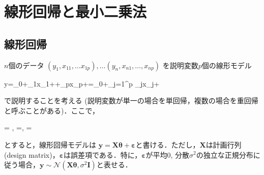 \section{線形回帰と最小二乗法}
\subsection{線形回帰}
$n$個のデータ $\left(y_1,x_{11}, \ldots x_{1p}\right),\ldots \left(y_n,x_{n1},\ldots, x_{np}\right)$ を説明変数$p$個の線形モデル 


y=\theta_0+\theta_1x_1+\cdots+\theta_px_p+\varepsilon=\theta_0+\sum_{j=1}^p \theta_jx_j+\varepsilon


で説明することを考える (説明変数が単一の場合を単回帰，複数の場合を重回帰と呼ぶことがある)．ここで， 


= ,\quad 
{}=,\quad
\mathbf{\theta}= 


とすると，線形回帰モデルは $\mathbf{y}=\mathbf{X}\mathbf{\theta}+\mathbf{\varepsilon}$と書ける．ただし，$\mathbf{X}$は計画行列 (design matrix)，$\mathbf{\varepsilon}$は誤差項である．特に，$\mathbf{\varepsilon}$が平均0, 分散$\sigma^2$の独立な正規分布に従う場合，$\mathbf{y}\sim \mathcal{N}(\mathbf{X}\mathbf{\theta}, \sigma^2\mathbf{I})$と表せる．
